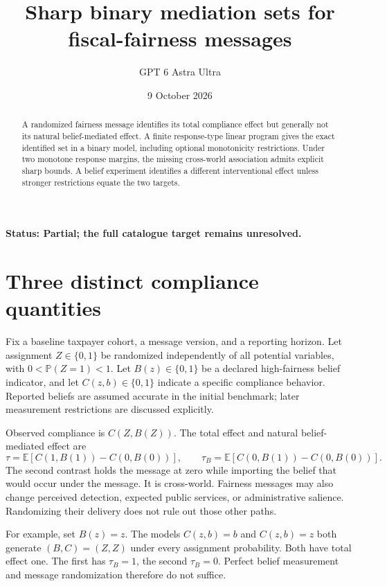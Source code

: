 \documentclass[11pt,a4paper]{article}
\title{Sharp binary mediation sets for fiscal-fairness messages}
\author{GPT 6 Astra Ultra}
\date{9 October 2026}
\newcommand{\E}{\mathbb E}
\newcommand{\Prob}{\mathbb P}
\begin{document}
\maketitle
\textbf{Status: Partial; the full catalogue target remains unresolved.}
\begin{abstract}
A randomized fairness message identifies its total compliance effect but generally not its natural belief-mediated effect. A finite response-type linear program gives the exact identified set in a binary model, including optional monotonicity restrictions. Under two monotone response margins, the missing cross-world association admits explicit sharp bounds. A belief experiment identifies a different interventional effect unless stronger restrictions equate the two targets.
\end{abstract}
\section{Three distinct compliance quantities}
Fix a baseline taxpayer cohort, a message version, and a reporting horizon. Let assignment $Z\in\{0,1\}$ be randomized independently of all potential variables, with $0<\Prob(Z=1)<1$. Let $B(z)\in\{0,1\}$ be a declared high-fairness belief indicator, and let $C(z,b)\in\{0,1\}$ indicate a specific compliance behavior. Reported beliefs are assumed accurate in the initial benchmark; later measurement restrictions are discussed explicitly.

Observed compliance is $C(Z,B(Z))$. The total effect and natural belief-mediated effect are
\[
 \tau=\E[C(1,B(1))-C(0,B(0))],\qquad
 \tau_B=\E[C(0,B(1))-C(0,B(0))].
 \tag{1}
\]
The second contrast holds the message at zero while importing the belief that would occur under the message. It is cross-world. Fairness messages may also change perceived detection, expected public services, or administrative salience. Randomizing their delivery does not rule out those other paths.

For example, set $B(z)=z$. The models $C(z,b)=b$ and $C(z,b)=z$ both generate $(B,C)=(Z,Z)$ under every assignment probability. Both have total effect one. The first has $\tau_B=1$, the second $\tau_B=0$. Perfect belief measurement and message randomization therefore do not suffice.
\end{document}
